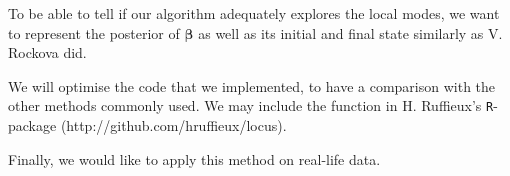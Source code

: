 \documentclass[a4paper, 11pt]{report}
\numberwithin{equation}{chapter}
\begin{document}
To be able to tell if our algorithm adequately explores the local modes, we want to represent the posterior of $\boldsymbol{\beta}$ as well as its initial and final state similarly as V. Rockova \citep{rockova} did.

We will optimise the code that we implemented, to have a comparison with the other methods commonly used. We may include the function in H. Ruffieux's \texttt{R}-package (http://github.com/hruffieux/locus).

Finally, we would like to apply this method on real-life data.
\newpage


\end{document}
